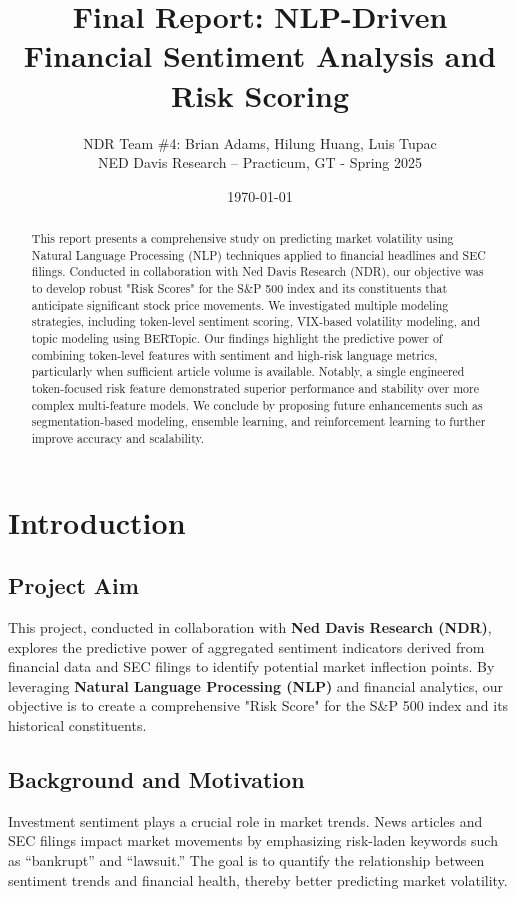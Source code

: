 \documentclass[twocolumn]{article}
\title{Final Report: NLP-Driven Financial Sentiment Analysis and Risk Scoring}
\author{NDR Team \#4: Brian Adams, Hilung Huang, Luis Tupac\\NED Davis Research – Practicum, GT - Spring 2025}
\date{\today}
\begin{document}
\maketitle

\begin{abstract}
This report presents a comprehensive study on predicting market volatility using Natural Language Processing (NLP) techniques applied to financial headlines and SEC filings. Conducted in collaboration with Ned Davis Research (NDR), our objective was to develop robust "Risk Scores" for the S\&P 500 index and its constituents that anticipate significant stock price movements. We investigated multiple modeling strategies, including token-level sentiment scoring, VIX-based volatility modeling, and topic modeling using BERTopic. Our findings highlight the predictive power of combining token-level features with sentiment and high-risk language metrics, particularly when sufficient article volume is available. Notably, a single engineered token-focused risk feature demonstrated superior performance and stability over more complex multi-feature models. We conclude by proposing future enhancements such as segmentation-based modeling, ensemble learning, and reinforcement learning to further improve accuracy and scalability.
\end{abstract}

\section{Introduction}
\subsection{Project Aim}
This project, conducted in collaboration with \textbf{Ned Davis Research (NDR)}, explores the predictive power of aggregated sentiment indicators derived from financial data and SEC filings to identify potential market inflection points. By leveraging \textbf{Natural Language Processing (NLP)} and financial analytics, our objective is to create a comprehensive "Risk Score" for the S\&P 500 index and its historical constituents.

\subsection{Background and Motivation}
Investment sentiment plays a crucial role in market trends. News articles and SEC filings impact market movements by emphasizing risk-laden keywords such as ``bankrupt'' and ``lawsuit.'' The goal is to quantify the relationship between sentiment trends and financial health, thereby better predicting market volatility.
\end{document}
